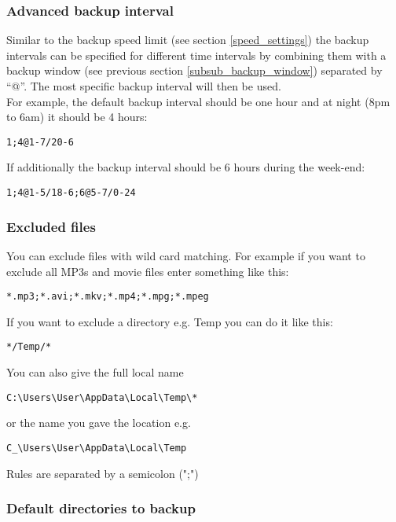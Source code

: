 \documentclass[a4paper,10pt]{article}
\begin{document}
\subsubsection{Advanced backup interval}
\label{advanced_backup_interval}

Similar to the backup speed limit (see section \ref{speed_settings}) the backup intervals can be specified for different time intervals by combining them with a backup window (see previous section \ref{subsub_backup_window}) separated by ``@''. The most specific backup interval will then be used.\\

\noindent For example, the default backup interval should be one hour and at night (8pm to 6am) it should be 4 hours:

\begin{verbatim}
1;4@1-7/20-6
\end{verbatim}

\noindent If additionally the backup interval should be 6 hours during the week-end:

\begin{verbatim}
1;4@1-5/18-6;6@5-7/0-24
\end{verbatim}

\subsubsection{Excluded files}
\label{subsub_excluded_files}

You can exclude files with wild card matching. For example if you want to exclude all MP3s and movie files enter something like this:
\begin{verbatim}
*.mp3;*.avi;*.mkv;*.mp4;*.mpg;*.mpeg
\end{verbatim}
If you want to exclude a directory e.g. Temp you can do it like this:
\begin{verbatim}
*/Temp/*
\end{verbatim}
You can also give the full local name
\begin{verbatim}
C:\Users\User\AppData\Local\Temp\*
\end{verbatim}
or the name you gave the location e.g.
\begin{verbatim}
C_\Users\User\AppData\Local\Temp
\end{verbatim}

Rules are separated by a semicolon (";")

\subsubsection{Default directories to backup}
\label{subsub_default_dirs}
\end{document}
